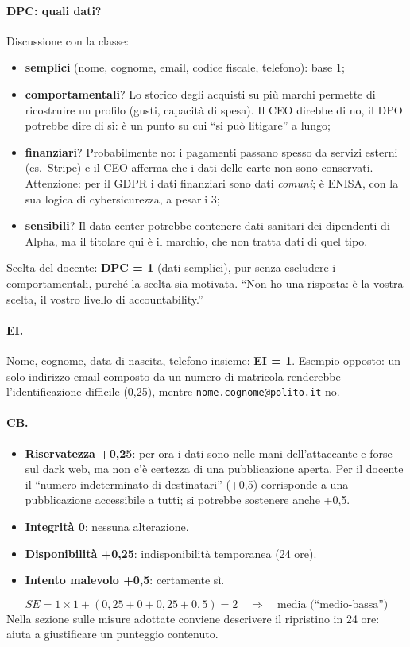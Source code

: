 \paragraph{DPC: quali dati?} Discussione con la classe:
\begin{itemize}
  \item \textbf{semplici} (nome, cognome, email, codice fiscale, telefono): base 1;
  \item \textbf{comportamentali}? Lo storico degli acquisti su più marchi permette di ricostruire un
    profilo (gusti, capacità di spesa). Il CEO direbbe di no, il DPO potrebbe dire di sì: è un punto su
    cui ``si può litigare'' a lungo;
  \item \textbf{finanziari}? Probabilmente no: i pagamenti passano spesso da servizi esterni (es.\
    Stripe) e il CEO afferma che i dati delle carte non sono conservati. Attenzione: per il GDPR i dati
    finanziari sono dati \emph{comuni}; è ENISA, con la sua logica di cybersicurezza, a pesarli 3;
  \item \textbf{sensibili}? Il data center potrebbe contenere dati sanitari dei dipendenti di Alpha, ma
    il titolare qui è il marchio, che non tratta dati di quel tipo.
\end{itemize}
Scelta del docente: \textbf{DPC = 1} (dati semplici), pur senza escludere i comportamentali, purché la
scelta sia motivata. ``Non ho una risposta: è la vostra scelta, il vostro livello di accountability.''

\paragraph{EI.} Nome, cognome, data di nascita, telefono insieme: \textbf{EI = 1}. Esempio opposto: un
solo indirizzo email composto da un numero di matricola renderebbe l'identificazione difficile
(0,25), mentre \texttt{nome.cognome@polito.it} no.

\paragraph{CB.}
\begin{itemize}
  \item \textbf{Riservatezza +0,25}: per ora i dati sono nelle mani dell'attaccante e forse sul dark
    web, ma non c'è certezza di una pubblicazione aperta. Per il docente il ``numero indeterminato di
    destinatari'' (+0,5) corrisponde a una pubblicazione accessibile a tutti; si potrebbe sostenere
    anche +0,5.
  \item \textbf{Integrità 0}: nessuna alterazione.
  \item \textbf{Disponibilità +0,25}: indisponibilità temporanea (24 ore).
  \item \textbf{Intento malevolo +0,5}: certamente sì.
\end{itemize}
\[
SE = 1 \times 1 + (0{,}25 + 0 + 0{,}25 + 0{,}5) = 2 \quad\Rightarrow\quad \text{media (``medio-bassa'')}
\]
Nella sezione sulle misure adottate conviene descrivere il ripristino in 24 ore: aiuta a giustificare
un punteggio contenuto.

